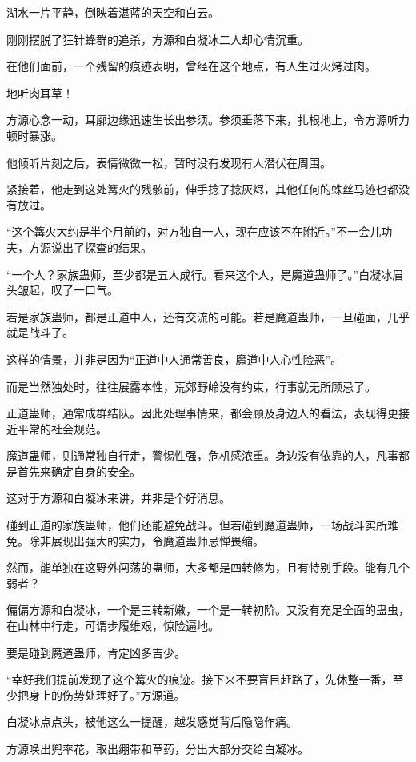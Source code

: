 
\begin{this_body}

湖水一片平静，倒映着湛蓝的天空和白云。

刚刚摆脱了狂针蜂群的追杀，方源和白凝冰二人却心情沉重。

在他们面前，一个残留的痕迹表明，曾经在这个地点，有人生过火烤过肉。

地听肉耳草！

方源心念一动，耳廓边缘迅速生长出参须。参须垂落下来，扎根地上，令方源听力顿时暴涨。

他倾听片刻之后，表情微微一松，暂时没有发现有人潜伏在周围。

紧接着，他走到这处篝火的残骸前，伸手捻了捻灰烬，其他任何的蛛丝马迹也都没有放过。

“这个篝火大约是半个月前的，对方独自一人，现在应该不在附近。”不一会儿功夫，方源说出了探查的结果。

“一个人？家族蛊师，至少都是五人成行。看来这个人，是魔道蛊师了。”白凝冰眉头皱起，叹了一口气。

若是家族蛊师，都是正道中人，还有交流的可能。若是魔道蛊师，一旦碰面，几乎就是战斗了。

这样的情景，并非是因为“正道中人通常善良，魔道中人心性险恶”。

而是当然独处时，往往展露本性，荒郊野岭没有约束，行事就无所顾忌了。

正道蛊师，通常成群结队。因此处理事情来，都会顾及身边人的看法，表现得更接近平常的社会规范。

魔道蛊师，则通常独自行走，警惕性强，危机感浓重。身边没有依靠的人，凡事都是首先来确定自身的安全。

这对于方源和白凝冰来讲，并非是个好消息。

碰到正道的家族蛊师，他们还能避免战斗。但若碰到魔道蛊师，一场战斗实所难免。除非展现出强大的实力，令魔道蛊师忌惮畏缩。

然而，能单独在这野外闯荡的蛊师，大多都是四转修为，且有特别手段。能有几个弱者？

偏偏方源和白凝冰，一个是三转新嫩，一个是一转初阶。又没有充足全面的蛊虫，在山林中行走，可谓步履维艰，惊险遍地。

要是碰到魔道蛊师，肯定凶多吉少。

“幸好我们提前发现了这个篝火的痕迹。接下来不要盲目赶路了，先休整一番，至少把身上的伤势处理好了。”方源道。

白凝冰点点头，被他这么一提醒，越发感觉背后隐隐作痛。

方源唤出兜率花，取出绷带和草药，分出大部分交给白凝冰。


\end{this_body}
